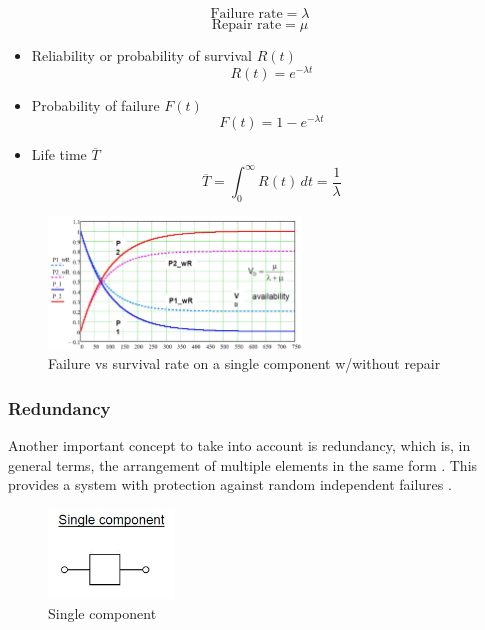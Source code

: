 \documentclass{article}
\begin{document}
\begin{doublespacing}
$$ \textrm{Failure rate} =  \lambda $$
$$ \textrm{Repair rate} =  \mu $$

\begin{itemize}

\item Reliability or probability of survival $ R(t) $
\begin{equation}
R(t) = e^{-\lambda t}
\label{eq:Rt1}
\end{equation}

\item Probability of failure $F(t)$
\begin{equation}
F(t) = 1 - e^{-\lambda t}
\label{eq:Ft1}
\end{equation}

\item Life time $\overline{T}$
\begin{equation}
\overline{T} = \int_{0}^{\infty} R(t) \,dt = \frac{1}{\lambda}
\label{eq:T1}
\end{equation}

\end{itemize}

\begin{figure}[H] 
    \centering
    \includegraphics[width=0.6\textwidth]{Images/FailurevSurvival.JPG} 
    \caption{Failure vs survival rate on a single component w/without repair \cite{kaestner:Mark}} 
    \label{fig:FailurevSurvival} 
\end{figure}



\subsubsection{Redundancy}
\par Another important concept to take into account is redundancy, which is, in general terms, the arrangement of multiple elements in the same form \cite{kaestner:Mark}. This provides a system with protection against random independent failures \cite{kaestner:Mark}.

\begin{figure}[H] 
    \centering
    \includegraphics[width=0.3\textwidth]{Images/SingleComponent.JPG} 
    \caption{Single component \cite{kaestner:Mark}} 
    \label{fig:SingleComponent} 
\end{figure}




\end{doublespacing}
\end{document}

